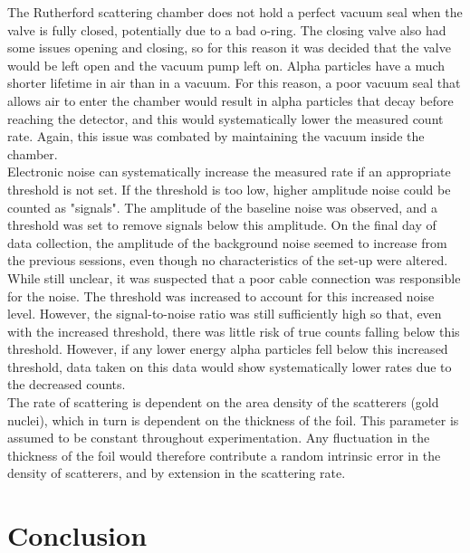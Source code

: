 \documentclass[a4paper]{article}
\begin{document}
\qq The Rutherford scattering chamber does not hold a perfect vacuum
seal when the valve is fully closed, potentially due to a bad o-ring. The closing valve also had some issues opening and closing, so for this reason it was decided that the valve would be left open and the vacuum pump left on. Alpha particles have a much shorter lifetime in air than in a vacuum. For this reason, a poor vacuum seal that allows air to enter the chamber would result in alpha particles that decay before reaching the detector, and this would systematically lower the measured count rate. Again, this issue was
combated by maintaining the vacuum inside the chamber. \\
\qq Electronic noise can systematically increase the measured rate if an appropriate threshold is not set. If the threshold is too low, higher amplitude noise could be counted as "signals". The amplitude of the baseline noise was observed, and a threshold was set to remove signals below this amplitude. On the final day of data collection, the amplitude of the background noise seemed to increase from the previous
sessions, even though no characteristics of the set-up were altered. While still unclear, it was suspected that a poor cable connection was responsible for the noise. The threshold was increased to account for this increased noise level. However, the
signal-to-noise ratio was still sufficiently high so that, even with the increased threshold, there was little risk of true counts falling below this threshold. However, if any lower energy alpha particles fell below this increased threshold, data taken on this data would show systematically lower rates due to the decreased counts. \\
\qq The rate of scattering is dependent on the area density of the
scatterers (gold nuclei), which in turn is dependent on the thickness of the foil. This parameter is assumed to be constant throughout experimentation. Any fluctuation in the thickness of the foil would therefore contribute a random intrinsic error in the
density of scatterers, and by extension in the scattering rate. 

\section{Conclusion}

\qq

\qq
\end{document}
